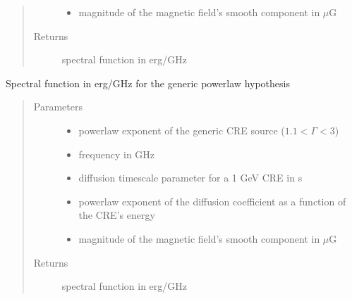 \documentclass[letterpaper,10pt,english]{sphinxmanual}
\begin{document}
\begin{fulllineitems}
\begin{quote}
\begin{description}
\begin{itemize}
\item {} 
\sphinxAtStartPar
{} \textendash{} magnitude of the magnetic field’s smooth component in \(\mu\)G

\end{itemize}

\item[{Returns}] \leavevmode
\sphinxAtStartPar
spectral function in erg/GHz

\end{description}\end{quote}

\end{fulllineitems}


\begin{fulllineitems}
\label{\detokenize{diffsph.spectra:diffsph.spectra.synchrotron.X_pw}}
\sphinxAtStartPar
Spectral function in erg/GHz for the generic power\sphinxhyphen{}law hypothesis
\begin{quote}\begin{description}
\item[{Parameters}] \leavevmode\begin{itemize}
\item {} 
\sphinxAtStartPar
{} \textendash{} power\sphinxhyphen{}law exponent of the generic CRE source (\(1.1 < \Gamma < 3\))

\item {} 
\sphinxAtStartPar
{} \textendash{} frequency in GHz

\item {} 
\sphinxAtStartPar
{} \textendash{} diffusion time\sphinxhyphen{}scale parameter for a 1 GeV CRE in s

\item {} 
\sphinxAtStartPar
{} \textendash{} power\sphinxhyphen{}law exponent of the diffusion coefficient as a function of the CRE’s energy

\item {} 
\sphinxAtStartPar
{} \textendash{} magnitude of the magnetic field’s smooth component in \(\mu\)G

\end{itemize}

\item[{Returns}] \leavevmode
\sphinxAtStartPar
spectral function in erg/GHz

\end{description}\end{quote}

\end{fulllineitems}
\end{document}
